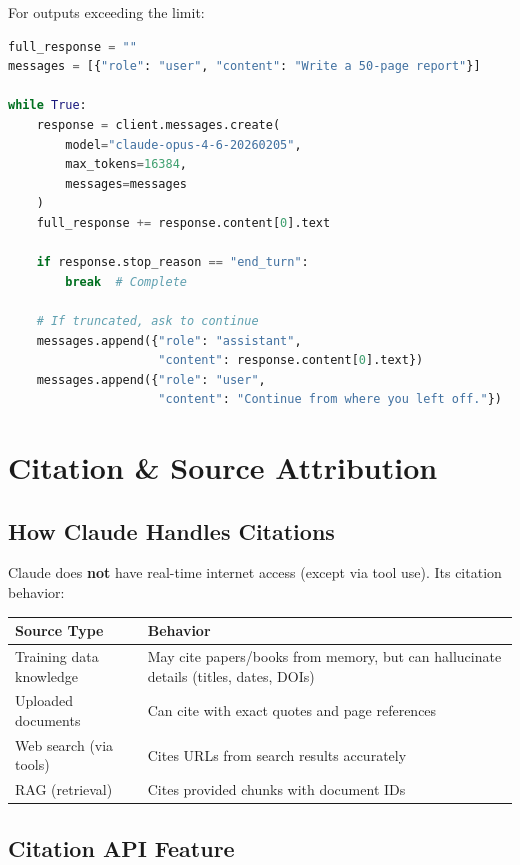 \documentclass[11pt,a4paper]{article}
\begin{document}
For outputs exceeding the limit:

\begin{lstlisting}[language=Python, caption={Chunked Generation for Long Outputs}]
full_response = ""
messages = [{"role": "user", "content": "Write a 50-page report"}]

while True:
    response = client.messages.create(
        model="claude-opus-4-6-20260205",
        max_tokens=16384,
        messages=messages
    )
    full_response += response.content[0].text
    
    if response.stop_reason == "end_turn":
        break  # Complete
    
    # If truncated, ask to continue
    messages.append({"role": "assistant", 
                     "content": response.content[0].text})
    messages.append({"role": "user", 
                     "content": "Continue from where you left off."})
\end{lstlisting}

\section{Citation \& Source Attribution}

\subsection{How Claude Handles Citations}

Claude does \textbf{not} have real-time internet access (except via tool use). Its citation behavior:

\begin{center}
\begin{tabular}{lL{9cm}}
\toprule
\textbf{Source Type} & \textbf{Behavior} \\
\midrule
Training data knowledge & May cite papers/books from memory, but can hallucinate details (titles, dates, DOIs) \\
Uploaded documents & Can cite with exact quotes and page references \\
Web search (via tools) & Cites URLs from search results accurately \\
RAG (retrieval) & Cites provided chunks with document IDs \\
\bottomrule
\end{tabular}
\end{center}

\subsection{Citation API Feature}
\end{document}
